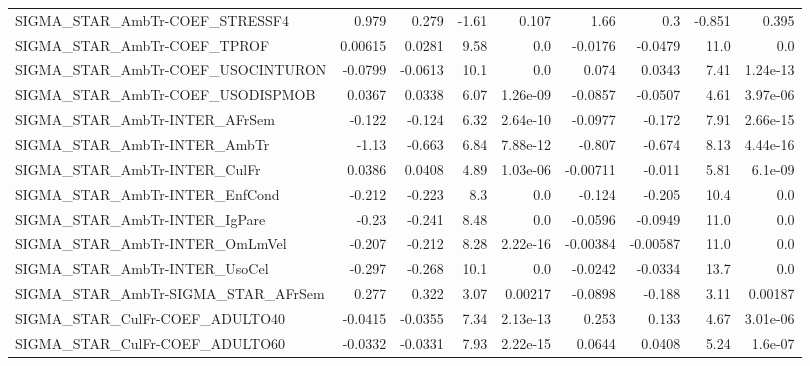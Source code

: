 \begin{tabular}{lrrrrrrrr}
SIGMA\_STAR\_AmbTr-COEF\_STRESSF4        &       0.979 &        0.279 &   -1.61 &    0.107 &       1.66 &         0.3 &       -0.851 &         0.395 \\
SIGMA\_STAR\_AmbTr-COEF\_TPROF           &     0.00615 &       0.0281 &    9.58 &      0.0 &    -0.0176 &     -0.0479 &         11.0 &           0.0 \\
SIGMA\_STAR\_AmbTr-COEF\_USOCINTURON     &     -0.0799 &      -0.0613 &    10.1 &      0.0 &      0.074 &      0.0343 &         7.41 &      1.24e-13 \\
SIGMA\_STAR\_AmbTr-COEF\_USODISPMOB      &      0.0367 &       0.0338 &    6.07 & 1.26e-09 &    -0.0857 &     -0.0507 &         4.61 &      3.97e-06 \\
SIGMA\_STAR\_AmbTr-INTER\_AFrSem         &      -0.122 &       -0.124 &    6.32 & 2.64e-10 &    -0.0977 &      -0.172 &         7.91 &      2.66e-15 \\
SIGMA\_STAR\_AmbTr-INTER\_AmbTr          &       -1.13 &       -0.663 &    6.84 & 7.88e-12 &     -0.807 &      -0.674 &         8.13 &      4.44e-16 \\
SIGMA\_STAR\_AmbTr-INTER\_CulFr          &      0.0386 &       0.0408 &    4.89 & 1.03e-06 &   -0.00711 &      -0.011 &         5.81 &       6.1e-09 \\
SIGMA\_STAR\_AmbTr-INTER\_EnfCond        &      -0.212 &       -0.223 &     8.3 &      0.0 &     -0.124 &      -0.205 &         10.4 &           0.0 \\
SIGMA\_STAR\_AmbTr-INTER\_IgPare         &       -0.23 &       -0.241 &    8.48 &      0.0 &    -0.0596 &     -0.0949 &         11.0 &           0.0 \\
SIGMA\_STAR\_AmbTr-INTER\_OmLmVel        &      -0.207 &       -0.212 &    8.28 & 2.22e-16 &   -0.00384 &    -0.00587 &         11.0 &           0.0 \\
SIGMA\_STAR\_AmbTr-INTER\_UsoCel         &      -0.297 &       -0.268 &    10.1 &      0.0 &    -0.0242 &     -0.0334 &         13.7 &           0.0 \\
SIGMA\_STAR\_AmbTr-SIGMA\_STAR\_AFrSem    &       0.277 &        0.322 &    3.07 &  0.00217 &    -0.0898 &      -0.188 &         3.11 &       0.00187 \\
SIGMA\_STAR\_CulFr-COEF\_ADULTO40        &     -0.0415 &      -0.0355 &    7.34 & 2.13e-13 &      0.253 &       0.133 &         4.67 &      3.01e-06 \\
SIGMA\_STAR\_CulFr-COEF\_ADULTO60        &     -0.0332 &      -0.0331 &    7.93 & 2.22e-15 &     0.0644 &      0.0408 &         5.24 &       1.6e-07 \\

\end{tabular}
